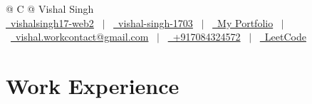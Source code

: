 \documentclass[a4paper,4pt]{article}
\begin{document}
\pagestyle{empty} 


\begin{tabularx}{\linewidth}{@{} C @{}}
\Huge{Vishal Singh} \\[7.5pt]
\href{https://github.com/vishalsingh17-web2}{\raisebox{-0.05\height}\faGithub\ vishalsingh17-web2} \ $|$ \ 
\href{https://linkedin.com/in/vishal-singh-1703}{\raisebox{-0.05\height}\faLinkedin\ vishal-singh-1703} \ $|$ \ 
\href{https://vishalportfolio1703.vercel.app/}{\raisebox{-0.05\height}\faGlobe \ My Portfolio} \ $|$ \ 
\href{mailto:vishal.workcontact@gmail.com}{\raisebox{-0.05\height}\faEnvelope \ vishal.workcontact@gmail.com} \ $|$ \ 
\href{tel:+917084324572}{\raisebox{-0.05\height}\faMobile \ +917084324572} \ $|$ \ 
\href{https://leetcode.com/Vishal_Singh_17/}{\raisebox{-0.05\height}\faCode \ LeetCode} \\
\end{tabularx}


\section{Work Experience}
\end{document}
